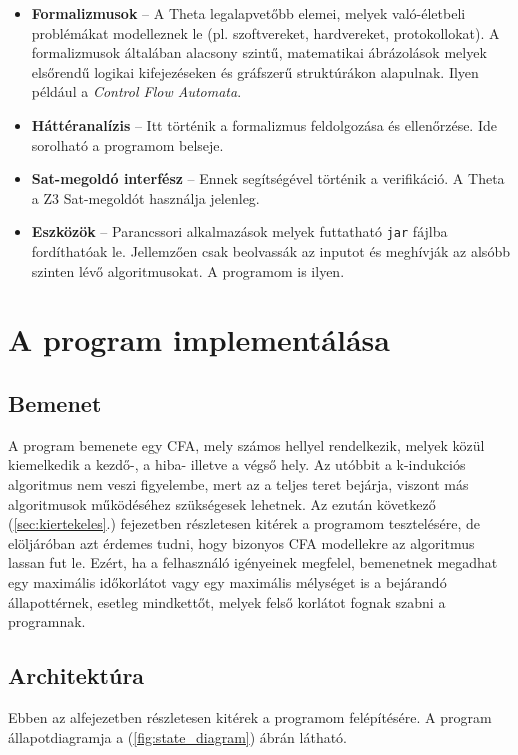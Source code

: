 \begin{itemize}
	\item \textbf{Formalizmusok} -- A Theta legalapvetőbb elemei, melyek való-életbeli problémákat modelleznek le (pl. szoftvereket, hardvereket, protokollokat). A formalizmusok általában alacsony szintű, matematikai ábrázolások melyek elsőrendű logikai kifejezéseken és gráfszerű struktúrákon alapulnak. Ilyen például a \emph{Control Flow Automata}.
	
	\item \textbf{Háttéranalízis} -- Itt történik a formalizmus feldolgozása és ellenőrzése. Ide sorolható a programom belseje.
	
	\item \textbf{Sat-megoldó interfész} -- Ennek segítségével történik a verifikáció. A Theta a Z3 Sat-megoldót használja jelenleg.
	
	\item \textbf{Eszközök} -- Parancssori alkalmazások melyek futtatható \verb+jar+ fájlba fordíthatóak le. Jellemzően csak beolvassák az inputot és meghívják az alsóbb szinten lévő algoritmusokat. A programom is ilyen.
	
\end{itemize}

\section{A program implementálása}
\label{sec:prog_imp}

\subsection{Bemenet}
A program bemenete egy CFA, mely számos hellyel rendelkezik, melyek közül kiemelkedik a kezdő-, a hiba- illetve a végső hely. Az utóbbit a k-indukciós algoritmus nem veszi figyelembe, mert az a teljes teret bejárja, viszont más algoritmusok működéséhez szükségesek lehetnek. Az ezután következő (\ref{sec:kiertekeles}.) fejezetben részletesen kitérek a programom tesztelésére, de elöljáróban azt érdemes tudni, hogy bizonyos CFA modellekre az algoritmus  lassan fut le. Ezért, ha a felhasználó igényeinek megfelel, bemenetnek megadhat egy maximális időkorlátot vagy egy maximális mélységet is a bejárandó állapottérnek, esetleg mindkettőt, melyek felső korlátot fognak szabni a programnak.

\subsection{Architektúra}
\label{sec:architektura}
Ebben az alfejezetben részletesen kitérek a programom felépítésére. A program állapotdiagramja a (\ref{fig:state_diagram}) ábrán látható.

